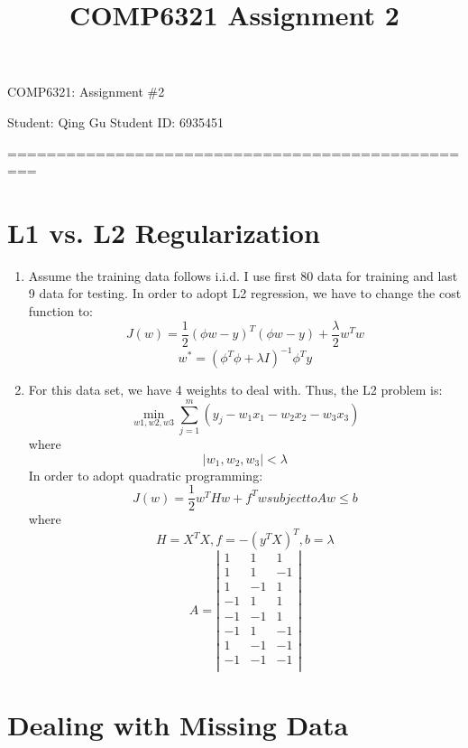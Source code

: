 \documentclass[a4paper, 12pt, titlepage]{article}
\begin{document}
\title{COMP6321 Assignment 2}
\setcounter{tocdepth}{2}
\newpage
\begin{center}
    {\huge COMP6321: Assignment \#2}


    \vspace{2cm}
    Student: Qing Gu  \hspace{5cm}
    Student ID: 6935451
    \vspace{1cm}

    =================================================
\end{center}
\section{L1 vs. L2 Regularization}
\begin{enumerate}
    \item Assume the training data follows i.i.d. I use first 80 data for training and last 9 data for testing. In order to adopt L2 regression, we have to change the cost function to:
        $$J(w) = \frac{1}{2}(\phi{}w-y)^T(\phi{}w-y)+\frac{\lambda}{2}w^Tw$$
        $$w^* = (\phi^T\phi+\lambda{}I)^{-1}\phi^Ty$$
        
    \item For this data set, we have 4 weights to deal with. Thus, the L2 problem is:
        $$\min_{w1, w2, w3} \sum^m_{j=1}(y_j-w_1x_1-w_2x_2-w_3x_3)$$
        where
        $$|w_1, w_2, w_3|<\lambda$$
        In order to adopt quadratic programming:
        $$J(w) = \frac{1}{2} w^THw + f^Tw subject to Aw\leq{}b$$
        where
        $$H = X^TX, f=-(y^TX)^T, b=\lambda$$
        \[A=
        \left|
        {\begin{array}{ccc}
                1 & 1 & 1\\
                1 & 1 & -1\\
                1 & -1 & 1\\
                -1 & 1 & 1\\
                -1 & -1 & 1\\
                -1 & 1 & -1\\
                1 & -1 & -1\\
                -1 & -1 & -1\\
        \end{array}}
        \right|
        \]
\end{enumerate}

\section{Dealing with Missing Data}
\end{document}
